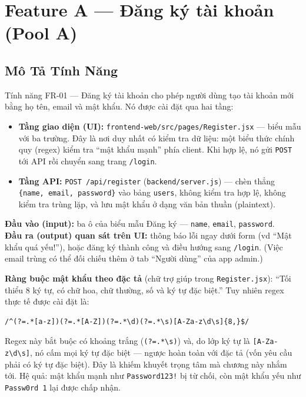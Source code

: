 \documentclass[12pt, a4paper]{report}
\begin{document}
\chapter{Feature A — Đăng ký tài khoản (Pool A)}

\section{Mô Tả Tính Năng}
Tính năng FR-01 — Đăng ký tài khoản cho phép người dùng tạo tài khoản mới bằng
họ tên, email và mật khẩu. Nó được cài đặt qua hai tầng:

\begin{itemize}
    \item \textbf{Tầng giao diện (UI):} \texttt{frontend-web/src/pages/Register.jsx} — biểu mẫu
    với ba trường. Đây là nơi duy nhất có kiểm tra dữ liệu: một biểu thức chính quy
    (regex) kiểm tra ``mật khẩu mạnh'' phía client. Khi hợp lệ, nó gửi \texttt{POST} tới API
    rồi chuyển sang trang \texttt{/login}.
    \item \textbf{Tầng API:} \texttt{POST /api/register} (\texttt{backend/server.js}) — chèn
    thẳng \verb|{name, email, password}| vào bảng \texttt{users}, không kiểm tra hợp lệ,
    không kiểm tra trùng lặp, và lưu mật khẩu ở dạng văn bản thuần (plaintext).
\end{itemize}

\noindent\textbf{Đầu vào (input):} ba ô của biểu mẫu Đăng ký — \texttt{name}, \texttt{email},
\texttt{password}.\\
\textbf{Đầu ra (output) quan sát trên UI:} thông báo lỗi ngay dưới form (vd ``Mật khẩu quá
yếu!''), hoặc đăng ký thành công và điều hướng sang \texttt{/login}. (Việc email trùng
có thể đối chiếu thêm ở tab ``Người dùng'' của app admin.)

\vspace{4pt}
\noindent\textbf{Ràng buộc mật khẩu theo đặc tả} (chữ trợ giúp trong \texttt{Register.jsx}):
``Tối thiểu 8 ký tự, có chữ hoa, chữ thường, số và ký tự đặc biệt.''
Tuy nhiên regex thực tế được cài đặt là:

\begin{lstlisting}[caption={Regex kiểm tra mật khẩu (Register.jsx)},numbers=none]
/^(?=.*[a-z])(?=.*[A-Z])(?=.*\d)(?=.*\s)[A-Za-z\d\s]{8,}$/
\end{lstlisting}

\begin{notebox}
Regex này bắt buộc có khoảng trắng (\texttt{(?=.*\textbackslash s)}) và, do lớp ký tự
là \texttt{[A-Za-z\textbackslash d\textbackslash s]}, nó cấm mọi ký tự đặc biệt — ngược
hoàn toàn với đặc tả (vốn yêu cầu phải có ký tự đặc biệt). Đây là khiếm khuyết trọng tâm
mà chương này nhắm tới. Hệ quả: mật khẩu mạnh như \texttt{Password123!} bị từ chối, còn
mật khẩu yếu như \texttt{Passw0rd 1} lại được chấp nhận.
\end{notebox}
\end{document}
